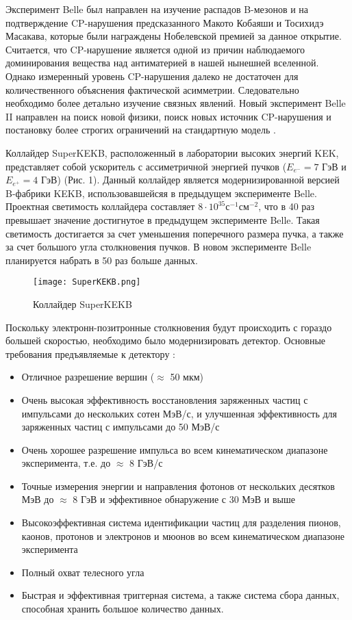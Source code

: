   Эксперимент Belle был направлен на изучение распадов B-мезонов и на подтверждение CP-нарушения предсказанного Макото Кобаяши и Тосихидэ Масакава, которые были награждены Нобелевской премией за данное открытие. Считается, что CP-нарушение является одной из причин наблюдаемого доминирования вещества над антиматерией в нашей нынешней вселенной. Однако измеренный уровень CP-нарушения далеко не достаточен для количественного объяснения фактической асимметрии. Следовательно необходимо более детально изучение связных явлений. Новый эксперимент Belle II направлен на поиск новой физики, поиск новых источник CP-нарушения и постановку более строгих ограничений на стандартную модель \cite{BelleIIExp}.\par 
Коллайдер SuperKEKB, расположенный в лаборатории высоких энергий KEK, представляет собой ускоритель с ассиметричной энергией пучков ($E_{e^-}=7$ ГэВ и $E_{e^+}=4$ ГэВ) (Рис. 1). Данный коллайдер является модернизированной версией B-фабрики KEKB, использовавшейсяя в предыдущем эксперименте Belle. Проектная светимость коллайдера составляет $8\cdot10^{35}$с$^{-1}$см$^{-2}$, что в 40 раз превышает значение достигнутое в предыдущем эксперименте Belle. Такая светимость достигается за счет уменьшения поперечного размера пучка, а также за счет большого угла столкновения пучков. В новом эксперименте Belle планируется набрать в 50 раз больше данных.\par
\begin{figure}[htp]
    \centering
    \texttt{[image: SuperKEKB.png]}
    \caption{Коллайдер SuperKEKB}
    \label{fig:galaxy}
\end{figure}
  Поскольку электронн-позитронные столкновения будут происходить с гораздо большей скоростью, необходимо было модернизировать детектор. Основные требования предъявляемые к детектору \cite{PhBook}: 
\begin{itemize}
  \item Отличное разрешение вершин ($\approx$ 50 мкм)
  \item Очень высокая эффективность восстановления заряженных частиц с импульсами до нескольких сотен МэВ/с, и улучшенная эффективность для заряженных частиц с импульсами до 50 МэВ/с
  \item Очень хорошее разрешение импульса во всем кинематическом диапазоне эксперимента, т.е. до $\approx$ 8 ГэВ/с
  \item Точные измерения энергии и направления фотонов от нескольких десятков МэВ до $\approx$ 8 ГэВ и эффективное обнаружение с 30 МэВ и выше
  \item Высокоэффективная система идентификации частиц для разделения пионов, каонов, протонов и электронов и мюонов во всем кинематическом диапазоне эксперимента
  \item Полный охват телесного угла
  \item Быстрая и эффективная триггерная система, а также система сбора данных, способная хранить большое количество данных.
\end{itemize} \par
